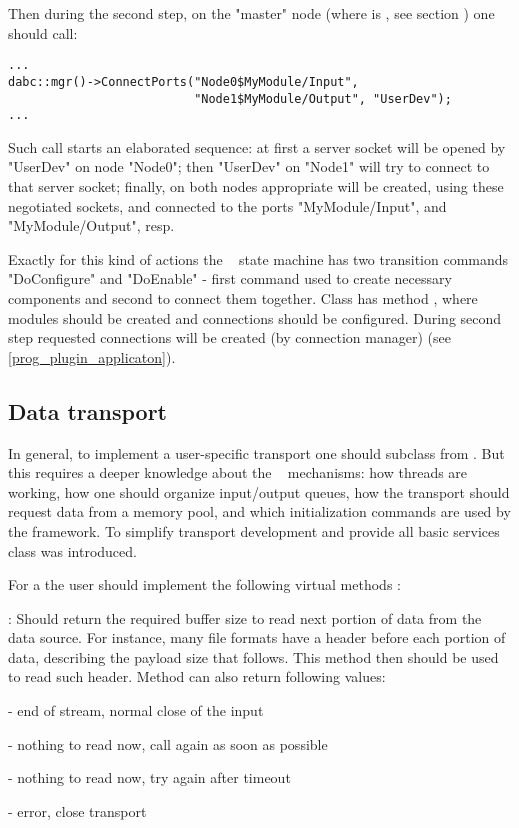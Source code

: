 Then during the second step, on the "master" node 
(where  is , 
see section )
one should call:
\begin{small}
\begin{verbatim}
...
dabc::mgr()->ConnectPorts("Node0$MyModule/Input", 
                          "Node1$MyModule/Output", "UserDev");
...
\end{verbatim}     
\end{small}
 
Such call starts an elaborated sequence: at first a server socket will be opened 
by  "UserDev" on node "Node0";
then  "UserDev" on "Node1" will try to connect to that server socket;
finally, on both nodes appropriate  
will be created, using these negotiated sockets,
and connected to the ports "MyModule/Input", and  "MyModule/Output", resp.

Exactly for this kind of actions the \dabc~ state machine has 
two transition commands "DoConfigure" and "DoEnable" - first command used to
create necessary components and second to connect them together. 
Class  has method , where
modules should be created and connections should be configured. During second step
requested connections will be created (by connection manager)
 (see \ref{prog_plugin_applicaton}).  


\subsection{Data transport}
\label{prog_plugin_device_datatransport}
In general, to implement a user-specific transport one should subclass from
. But this requires a deeper knowledge 
about the \dabc~ mechanisms:
how threads are working,
how one should organize input/output queues, how the transport should request data from a
memory pool, and which initialization commands are used by the framework. 
To simplify transport development and provide all basic services 
class  was introduced.  

For a  the
user should implement the  following virtual methods : 

\bbul
\item [\func{Read\_Size()}] : 
   Should return the required buffer size to read next portion of data from
   the data source. For instance, many file formats have a header before
   each portion of data, describing the payload size that follows. 
   This method then should be used to read such header. 
   Method can also return following values:
   \bdes
   \item[\keyw{dabc::di\_EndOfStream}] - end of stream, normal close of the input
   \item[\keyw{dabc::di\_Repeat}]      - nothing to read now, call again as soon as possible
   \item[\keyw{dabc::di\_RepeatTimeout}] - nothing to read now, try again after timeout
   \item[\keyw{dabc::di\_Error}]         - error, close transport
   \edes

